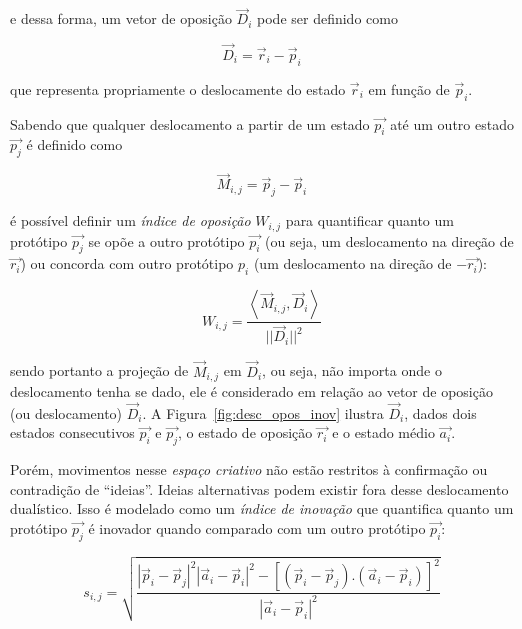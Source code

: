 \noindent e dessa forma, um vetor de oposição $\vec{D}_i$ pode ser definido como

\begin{equation}
\vec{D}_i=\vec{r}_i - \vec{p}_i
\end{equation}

\noindent que representa propriamente o deslocamente do estado $\vec{r}_i$ em
função de $\vec{p}_i$.

Sabendo que qualquer deslocamento a partir de um estado $\vec{p_i}$ até um outro
estado $\vec{p_j}$ é definido como

\begin{equation}
\vec{M}_{i,j} = \vec{p}_j - \vec{p}_i
\end{equation}

\noindent é possível definir um \emph{índice de oposição} $W_{i,j}$ para
quantificar quanto um protótipo $\vec{p_j}$ se opõe a outro protótipo $\vec{p_i}$ (ou seja,
um deslocamento na direção de $\vec{r_i}$) ou concorda com outro protótipo $p_i$
(um deslocamento na direção de $-\vec{r_i}$):

\begin{equation}
W_{i,j} = \frac{\left< \vec{M}_{i,j}, \vec{D}_i\right>}{||\vec{D}_i||^2}
\end{equation}

\noindent sendo portanto a projeção de $\vec{M}_{i,j}$ em $\vec{D}_i$, ou seja,
não importa onde o deslocamento tenha se dado, ele é considerado em relação ao
vetor de oposição (ou deslocamento) $\vec{D}_i$. A
Figura~\ref{fig:desc_opos_inov} ilustra $\vec{D}_i$, dados dois estados
consecutivos $\vec{p_i}$ e $\vec{p_j}$, o estado de oposição $\vec{r_i}$ e o
estado médio $\vec{a_i}$.

Porém, movimentos nesse \textit{espaço criativo} não estão restritos à
confirmação ou contradição de ``ideias''. Ideias alternativas podem existir fora
desse deslocamento dualístico. Isso é modelado como um \emph{índice de inovação}
que quantifica quanto um protótipo $\vec{p_j}$ é inovador quando comparado com um
outro protótipo $\vec{p_i}$:


\begin{equation}
s_{i,j} = \sqrt{\frac{|\vec{p}_i-\vec{p}_j|^2
          |\vec{a}_i-\vec{p}_i|^2 - 
          [(\vec{p}_i-\vec{p}_j) . 
            (\vec{a}_i-\vec{p}_i)]^2}
        {|\vec{a}_i-\vec{p}_i|^2}}
\end{equation}

